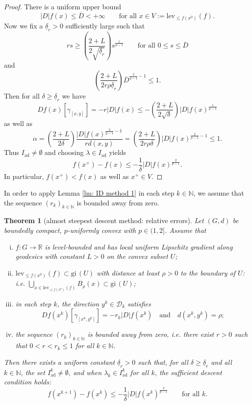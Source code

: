 \documentclass{article}
\theoremstyle{plain}\newtheorem{theorem}{Theorem}[section]
\theoremstyle{plain}\newtheorem{definition}[theorem]{Definition}
\theoremstyle{plain}\newtheorem{lemma}[theorem]{Lemma}
\theoremstyle{definition}\newtheorem{remark}[theorem]{Remark}
\theoremstyle{definition}\newtheorem{example}[theorem]{Example}
\theoremstyle{plain}\newtheorem{proposition}[theorem]{Proposition}
\theoremstyle{plain}\newtheorem{inference}[theorem]{Inference}
\theoremstyle{plain}\newtheorem{corollary}[theorem]{Corollary}
\theoremstyle{plain}\newtheorem{assumption}[theorem]{Assumption}
\newcommand{\bbN}{\mathbb{N}}
\begin{document}
\begin{proof}
    There is a uniform upper bound
    $$
    |D|f(x)\leq\overline{D}<+\infty \qquad\text{for all}\,\,x\in V:=\mathrm{lev}_{\leq f(x^0)}(f).
    $$
    Now we fix a $\underline{\delta}_r>0$ sufficiently large such that
    \begin{equation}\label{eq: ID method delta 1}
        rs\geq\left(\frac{2+L}{2\sqrt{\underline{\delta}_r}}\right)s^{\frac{1}{p-1}} \qquad\text{for all}\,\,0\leq s\leq\overline{D}
    \end{equation}
    and
    \begin{equation}\label{eq: ID method delta 2}
        \left(\frac{2+L}{2r\rho\underline{\delta}_r}\right)\overline{D}^{\frac{2}{p-1}-1}\leq 1.
    \end{equation}
    Then for all $\delta\geq\underline{\delta}_r$ we have
    $$
    Df(x)[\gamma_{[x,y]}]=-r|D|f(x)\leq-\left(\frac{2+L}{2\sqrt{\delta}}\right)|D|f(x)^{\frac{1}{p-1}}
    $$
    as well as
    $$
    \alpha=\left(\frac{2+L}{2\delta}\right)\frac{|D|f(x)^{\frac{2}{p-1}-1}}{rd(x,y)}=\left(\frac{2+L}{2r\rho\delta}\right)|D|f(x)^{\frac{2}{p-1}-1}\leq 1.
    $$
    Thus $I_{\mathrm{ad}}\neq\emptyset$ and choosing $\lambda\in I_{\mathrm{ad}}$ yields
    $$
    f(x^+)-f(x)\leq-\frac{1}{\delta}|D|f(x)^{\frac{2}{p-1}}.
    $$
    In particular,  $f(x^+)<f(x)$ as well as $x^+\in V$.
\end{proof}
In order to apply Lemma \ref{lm: ID method 1} in each step $k\in\bbN$, we assume that the sequence $(r_k)_{k\in\bbN}$ is bounded away from zero.
\begin{theorem}[almost steepest descent method: relative errors]\label{th: ID method 1}
    Let $(G,d)$ be boundedly compact, $p$-uniformly convex with $p\in(1,2]$. Assume that
    \begin{enumerate}[(i)]
        \item $f:G\to\mathbb{R}$ is level-bounded and has local uniform Lipschitz gradient along geodesics with constant $L>0$ on the convex subset $U$;
        \item $\mathrm{lev}_{\leq f(x^0)}(f)\subset \mathrm{gi}\,(U)$ with distance at least $\rho>0$ to the boundary of $U$: i.e. $\bigcup_{x\in \mathrm{lev}_{\leq f(x^0)}(f)} B_\rho(x)\subset \mathrm{gi}\,(U)$;
        \item in each step $k$, the direction $y^k\in\mathcal{D}_k$ satisfies
        $$
        Df(x^k)[\gamma_{[x^k,y^k]}]=-r_k|D|f(x^k) \quad\text{and}\quad d(x^k,y^k)=\rho;
        $$
        \item the sequence $(r_k)_{k\in\bbN}$ is bounded away from zero, i.e. there exist $r>0$ such that $0<r<r_k\leq 1$ for all $k\in\bbN$.
    \end{enumerate}
    Then there exists a uniform constant $\underline{\delta}_r>0$ such that, for all $\delta\geq\underline{\delta}_r$ and all $k\in\bbN$, the set $I_{\mathrm{ad}}^k\neq\emptyset$, and when $\lambda_k\in I_{\mathrm{ad}}^k$ for all $k$, the sufficient descent condition holds:
    $$
    f(x^{k+1})-f(x^k)\leq-\frac{1}{\delta}|D|f(x^k)^{\frac{2}{p-1}} \qquad\text{for all}\,\,k.
    $$
\end{theorem}
\end{document}
